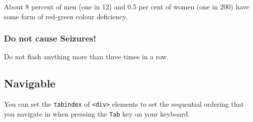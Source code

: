 About 8 percent of men (one in 12) and 0.5 per cent of women (one in 200) have some form of red-green colour deficiency.

\subsubsection{Do not cause Seizures!}
Do not flash anything more than three times in a row.

\subsection{Navigable}
You can set the \texttt{tabindex} of \texttt{<div>} elements to set the sequential ordering that you navigate in when pressing the \texttt{Tab} key on your keyboard. 
